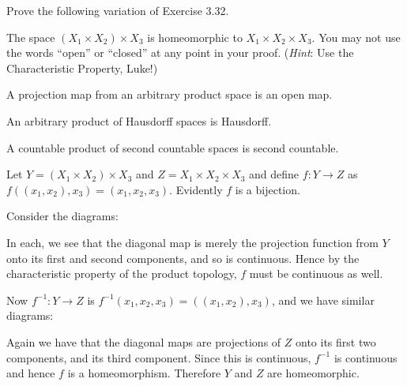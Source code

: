 \documentclass{homework651}
\newcommand\ra{\rightarrow}
\begin{document}
\begin{aproblems}

\hproblem Prove the following variation of Exercise 3.32.
\begin{subproblems}
\item  The space $(X_1\times X_2)\times X_3$ is homeomorphic to
$X_1\times X_2 \times X_3$.  You may not use the words ``open'' or ``closed''
at any point in your proof.  (\emph{Hint}: Use the Characteristic Property, Luke!)

\item A projection map from an arbitrary product space is an open map.

\item An arbitrary product of Hausdorff spaces is Hausdorff.

\item A countable product of second countable spaces is second countable.

\end{subproblems}

\subsol
Let $Y = (X_1\times X_2)\times X_3$ and $Z = X_1\times X_2 \times X_3$
and define $f:Y\ra Z$ as $f((x_1,x_2),x_3)=(x_1,x_2,x_3)$.  Evidently
$f$ is a bijection.

Consider the diagrams:

\centerline{
\qquad
{}
}

In each, we see that the diagonal map is merely the projection function
from $Y$ onto its first and second components, and so is continuous.  Hence
by the characteristic property of the product topology, $f$ must be continuous
as well.

Now $f^{-1}:Y\ra Z$ is $f^{-1}(x_1,x_2,x_3)=((x_1,x_2),x_3)$, and
we have similar diagrams:

\centerline{
\qquad
{}
}

Again we have that the diagonal maps are projections of $Z$ onto its
first two components, and its third component.  Since this is continuous,
$f^{-1}$ is continuous and hence $f$ is a homeomorphism.  Therefore
$Y$ and $Z$ are homeomorphic.


\end{aproblems}
\end{document}
